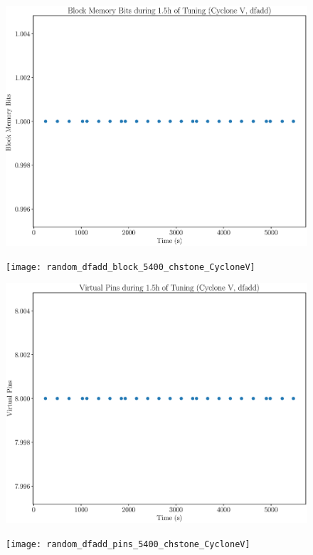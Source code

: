 \documentclass[12pt, a4paper]{article}
\begin{document}
\begin{figure}[htpb]
    \begin{minipage}{.48\textwidth}
        \includegraphics[scale=.25]{dfadd_block_5400_chstone_CycloneV}
    \end{minipage}%
    \hfill
    \begin{minipage}{.48\textwidth}
        \texttt{[image: random\_dfadd\_block\_5400\_chstone\_CycloneV]}
    \end{minipage}%

    \begin{minipage}{.48\textwidth}
        \includegraphics[scale=.25]{dfadd_pins_5400_chstone_CycloneV}
    \end{minipage}%
    \hfill
    \begin{minipage}{.48\textwidth}
        \texttt{[image: random\_dfadd\_pins\_5400\_chstone\_CycloneV]}
    \end{minipage}%


\end{figure}
\end{document}

